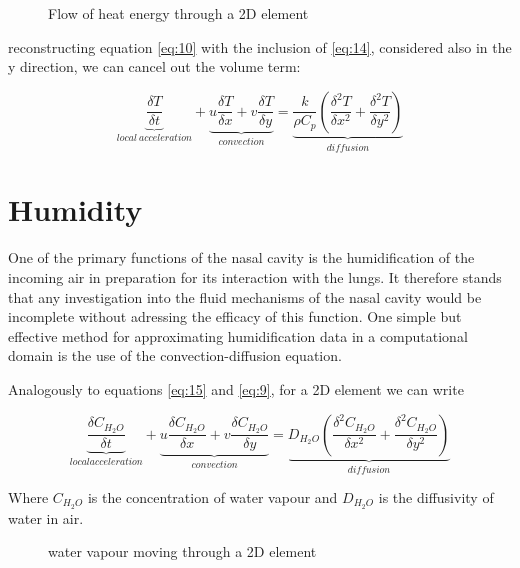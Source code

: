     \begin{figure} \label{fig:eneq}
      \caption{Flow of heat energy through a 2D element}
    \end{figure}

    reconstructing equation \ref{eq:10} with the inclusion of \ref{eq:14}, considered also in the y direction, we can cancel out the volume term:

    \begin{equation} \label{eq:15}
      \underbrace{\frac{\delta T}{\delta t}}_{local\ acceleration} + \underbrace{u \frac{\delta T}{\delta x} + v \frac{\delta T}{\delta y}}_{convection} = \underbrace{\frac{k}{\rho C_{p}} ( \frac{\delta^2 T}{\delta x^2} + \frac{\delta^2 T}{\delta y^2} )}_{diffusion}
    \end{equation}

\section{Humidity}

One of the primary functions of the nasal cavity is the humidification of the incoming air in preparation for its interaction with the lungs. It therefore stands that any investigation into the fluid mechanisms of the nasal cavity would be incomplete without adressing the efficacy of this function. One simple but effective method for approximating humidification data in a computational domain is the use of the convection-diffusion equation.

Analogously to equations \ref{eq:15} and \ref{eq:9}, for a 2D element we can write

\begin{equation} \label{eq:16}
  \underbrace{\frac{\delta C_{H_{2} O}}{\delta t}}_{local acceleration} + \underbrace{u \frac{\delta C_{H_{2} O}}{\delta x} + v \frac{\delta C_{H_{2} O}}{\delta y}}_{convection} = \underbrace{D_{H_{2} O} ( \frac{\delta^2 C_{H_{2} O}}{\delta x^2} + \frac{\delta^2 C_{H_{2} O}}{\delta y^2} )}_{diffusion}
\end{equation} \nocite{Naftali1998}

Where $C_{H_{2} O}$ is the concentration of water vapour and $D_{H_{2} O}$ is the diffusivity of water in air.

\begin{figure} \label{fig:h2oel}
  \caption{water vapour moving through a 2D element}
\end{figure}

